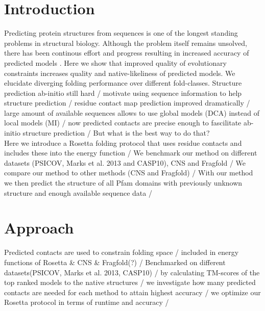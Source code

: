 \documentclass{bioinfo}
\begin{document}
\section{Introduction}
Predicting protein structures from sequences is one of the longest standing problems in structural biology. Although the problem itself remains unsolved, there has been continous effort and progress resulting in increased accuracy of predicted models \cite{casp}. 
Here we show that improved quality of evolutionary constraints increases quality and native-likeliness of predicted models. We elucidate diverging folding performance over different fold-classes. 
Structure prediction ab-initio still hard / motivate using sequence information to help structure prediction / residue contact map prediction improved dramatically / large amount of available sequences allows to use global models (DCA) instead of local models (MI) / now predicted contacts are precise enough to fascilitate ab-initio structure prediction / But what is the best way to do that? \\ 
Here we introduce a Rosetta folding protocol that uses residue contacts and includes these into the energy function / We benchmark our method on different datasets (PSICOV, Marks et al. 2013 and CASP10), CNS and Fragfold / We compare our method to other methods (CNS and Fragfold) / With our method we then predict the structure of all Pfam domains with previously unknown structure and enough available sequence data / 

\section{Approach}
Predicted contacts are used to constrain folding space / included in energy functions of Rosetta \& CNS \& Fragfold(?) / Benchmarked on different datasets(PSICOV, Marks et al. 2013, CASP10) / by calculating TM-scores of the top ranked models to the native structures / we investigate how many predicted contacts are needed for each method to attain highest accuracy / we optimize our Rosetta protocol in terms of runtime and accuracy / 
\end{document}
